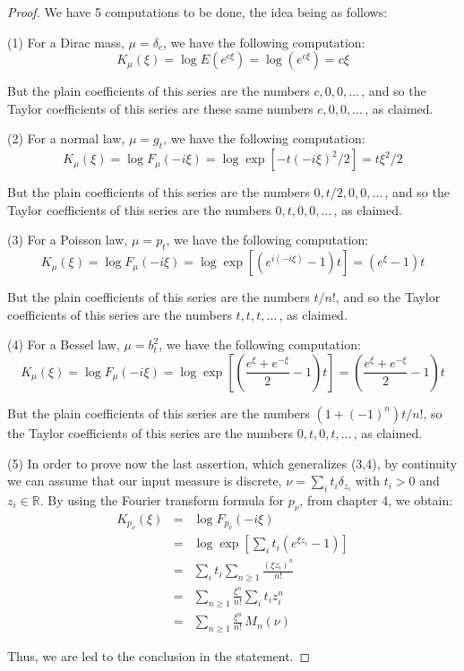 \documentclass[12pt]{amsbook}
\begin{document}
\begin{proof}
We have 5 computations to be done, the idea being as follows:

\medskip

(1) For a Dirac mass, $\mu=\delta_c$, we have the following computation:
$$K_\mu(\xi)
=\log E(e^{c\xi})
=\log(e^{c\xi})
=c\xi$$

But the plain coefficients of this series are the numbers $c,0,0,\ldots\,$, and so the Taylor coefficients of this series are these same numbers $c,0,0,\ldots\,$, as claimed.

\medskip

(2) For a normal law, $\mu=g_t$, we have the following computation:
$$K_\mu(\xi)
=\log F_\mu(-i\xi)
=\log\exp\left[-t(-i\xi)^2/2\right]
=t\xi^2/2$$

But the plain coefficients of this series are the numbers $0,t/2,0,0,\ldots\,$, and so the Taylor coefficients of this series are the numbers $0,t,0,0,\ldots\,$, as claimed.

\medskip

(3) For a Poisson law, $\mu=p_t$, we have the following computation:
$$K_\mu(\xi)
=\log F_\mu(-i\xi)
=\log\exp\left[(e^{i(-i\xi)}-1)t\right]
=(e^\xi-1)t$$

But the plain coefficients of this series are the numbers $t/n!$, and so the Taylor coefficients of this series are the numbers $t,t,t,\ldots\,$, as claimed.

\medskip

(4) For a Bessel law, $\mu=b_t^2$, we have the following computation:
$$K_\mu(\xi)
=\log F_\mu(-i\xi)
=\log\exp\left[\left(\frac{e^\xi+e^{-\xi}}{2}-1\right)t\right]
=\left(\frac{e^\xi+e^{-\xi}}{2}-1\right)t$$

But the plain coefficients of this series are the numbers $(1+(-1)^n)t/n!$, so the Taylor coefficients of this series are the numbers $0,t,0,t,\ldots\,$, as claimed.

\medskip

(5) In order to prove now the last assertion, which generalizes (3,4), by continuity we can assume that our input measure is discrete, $\nu=\sum_i t_i\delta_{z_i}$ with $t_i>0$ and $z_i\in\mathbb R$. By using the Fourier transform formula for $p_\nu$, from chapter 4, we obtain:
\begin{eqnarray*}
K_{p_\nu}(\xi)
&=&\log F_{p_\nu}(-i\xi)\\
&=&\log\exp\left[\sum_it_i(e^{\xi z_i}-1)\right]\\
&=&\sum_it_i\sum_{n\geq1}\frac{(\xi z_i)^n}{n!}\\
&=&\sum_{n\geq1}\frac{\xi^n}{n!}\sum_it_iz_i^n\\
&=&\sum_{n\geq1}\frac{\xi^n}{n!}\,M_n(\nu)
\end{eqnarray*}

Thus, we are led to the conclusion in the statement.
\end{proof}
\end{document}
